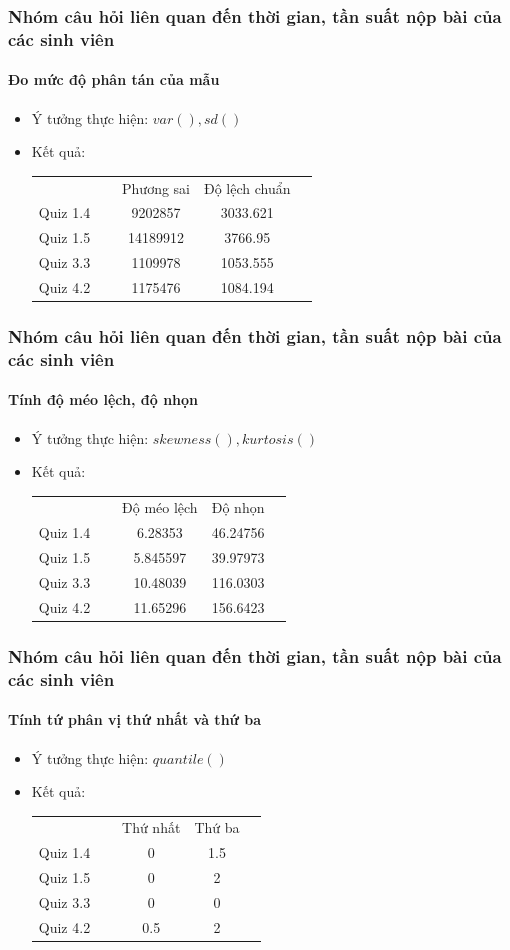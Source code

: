 \documentclass[english,10pt,table]{beamer}
\begin{document}
\frame
{
\frametitle{Nhóm câu hỏi liên quan đến thời gian, tần suất nộp bài của các sinh viên}
\framesubtitle{Đo mức độ phân tán của mẫu}
\begin{itemize}
    \item Ý tưởng thực hiện: $var(), sd()$
    \item Kết quả:\\
    \begin{center}
        \begin{tabular}{l l c c c}
             & & Phương sai & Độ lệch chuẩn\\
             Quiz 1.4 & $\;$ & 9202857 & 3033.621\\
             Quiz 1.5 & $\;$ & 14189912 & 3766.95\\
             Quiz 3.3 & $\;$ & 1109978 & 1053.555\\
             Quiz 4.2 & $\;$ & 1175476 & 1084.194
        \end{tabular}
    \end{center}
\end{itemize}
}

\frame
{
\frametitle{Nhóm câu hỏi liên quan đến thời gian, tần suất nộp bài của các sinh viên}
\framesubtitle{Tính độ méo lệch, độ nhọn}
\begin{itemize}
    \item Ý tưởng thực hiện: $skewness(), kurtosis()$
    \item Kết quả:\\
    \begin{center}
        \begin{tabular}{l l c c c}
             & & Độ méo lệch & Độ nhọn\\
             Quiz 1.4 & $\;$ & 6.28353 & 46.24756\\
             Quiz 1.5 & $\;$ & 5.845597 & 39.97973\\
             Quiz 3.3 & $\;$ & 10.48039 & 116.0303\\
             Quiz 4.2 & $\;$ & 11.65296 & 156.6423
        \end{tabular}
    \end{center}
\end{itemize}
}

\frame
{
\frametitle{Nhóm câu hỏi liên quan đến thời gian, tần suất nộp bài của các sinh viên}
\framesubtitle{Tính tứ phân vị thứ nhất và thứ ba}
\begin{itemize}
    \item Ý tưởng thực hiện: $quantile()$
    \item Kết quả:\\
    \begin{center}
        \begin{tabular}{l l c c c}
             & & Thứ nhất & Thứ ba\\
             Quiz 1.4 & $\;$ & 0 & 1.5\\
             Quiz 1.5 & $\;$ & 0 & 2\\
             Quiz 3.3 & $\;$ & 0 & 0\\
             Quiz 4.2 & $\;$ & 0.5 & 2
        \end{tabular}
    \end{center}
\end{itemize}
}
\end{document}
